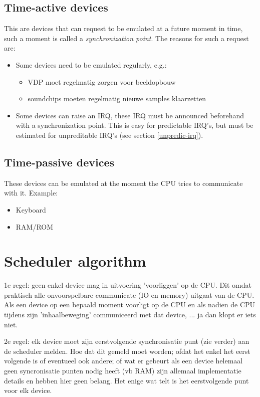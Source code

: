 \documentclass[11pt, a4paper]{report}
\begin{document}
\subsection*{Time-active devices}
This are devices that can request to be emulated at a future moment in time,
such a moment is called a \emph{synchronization point}. The reasons for such a request
are:
\begin{itemize}
\item Some devices need to be emulated regularly, e.g.:
	\begin{itemize}
	\item VDP moet regelmatig zorgen voor beeldopbouw 
	\item soundchips moeten regelmatig nieuwe samples klaarzetten
	\end{itemize}
\item Some devices can raise an IRQ, these IRQ must be announced beforehand
with a synchronization point. This is easy for predictable IRQ's, but must be
estimated for unpreditable IRQ's (see section \ref{unpredic-irq}).
\end{itemize}

\subsection*{Time-passive devices}
These devices can be emulated at the moment the CPU tries to communicate with
it. Example: 
\begin{itemize}
\item Keyboard
\item RAM/ROM
\end{itemize}


\section{Scheduler algorithm}

1e regel: geen enkel device mag in uitvoering 'voorliggen' op de CPU.
  Dit omdat praktisch alle onvoorspelbare communicate (IO en memory) uitgaat
  van de CPU. Als een device op een bepaald moment voorligt op de CPU en als 
  nadien de CPU tijdens zijn 'inhaalbeweging' communiceerd met dat device, ...
  ja dan klopt er iets niet.

2e regel: elk device moet zijn eerstvolgende synchronisatie punt (zie verder)
  aan de scheduler melden. Hoe dat dit gemeld moet worden; ofdat het enkel het
  eerst volgende is of eventueel ook andere; of wat er gebeurt als een device
  helemaal geen syncronisatie punten nodig heeft (vb RAM) zijn allemaal 
  implementatie details en hebben hier geen belang. Het enige wat telt is het
  eerstvolgende punt voor elk device.
\end{document}
